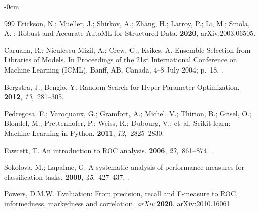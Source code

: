 \documentclass[diagnostics,article,accept,pdftex,moreauthors]{Definitions/mdpi}
\begin{document}
\begin{adjustwidth}{-\extralength}{0cm}
\begin{thebibliography}{999}
Erickson, N.; Mueller, J.; Shirkov, A.; Zhang, H.; Larroy, P.; Li, M.; Smola,
  A.
: Robust and Accurate {AutoML} for Structured
  Data.
 {\bf 2020}, arXiv:2003.06505.

Caruana, R.; Niculescu-Mizil, A.; Crew, G.; Ksikes, A.
\newblock Ensemble Selection from Libraries of Models.
\newblock In Proceedings of the  21st International
  Conference on Machine Learning (ICML), Banff, AB, Canada,  {4--8 July} %
 2004; p.~18.
.

Bergstra, J.; Bengio, Y.
\newblock Random Search for Hyper-Parameter Optimization.
 {\bf 2012}, {\em
  13},~281--305.

Pedregosa, F.; Varoquaux, G.; Gramfort, A.; Michel, V.; Thirion, B.; Grisel,
  O.; Blondel, M.; Prettenhofer, P.; Weiss, R.; Dubourg, V.;  et~al.
\newblock Scikit-learn: Machine Learning in {P}ython.
 {\bf 2011}, {\em
  12},~2825--2830.

Fawcett, T.
\newblock An introduction to ROC analysis.
 {\bf 2006}, {\em 27},~861--874.
.

Sokolova, M.; Lapalme, G.
\newblock A systematic analysis of performance measures for classification
  tasks.
 {\bf 2009}, {\em
  45},~427--437.
.

Powers, D.M.W.
\newblock Evaluation: From precision, recall and F-measure to ROC,
  informedness, markedness and correlation.  \emph{arXiv} \textbf{2020}. arXiv:2010.16061


\end{thebibliography}
\end{adjustwidth}
\end{document}
